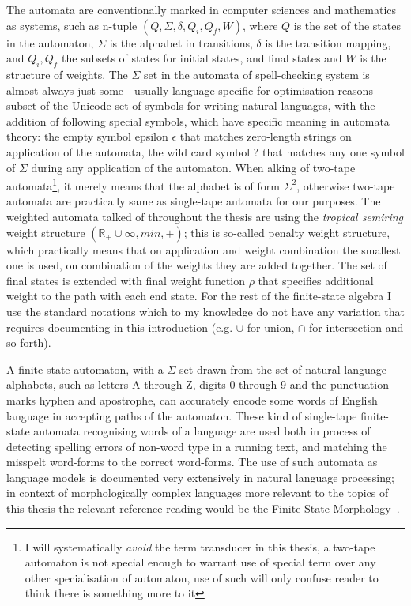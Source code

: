 \documentclass[officiallayout,draft]{unihelcompling}
\begin{document}
The automata are conventionally marked in computer sciences and mathematics as
systems, such as n-tuple $(Q, \Sigma, \delta, Q_i, Q_f, W)$, where $Q$ is the
set of the states in the automaton, $\Sigma$ is the alphabet in transitions,
$\delta$ is the transition mapping, and $Q_i, Q_f$ the subsets of states for
initial states, and final states and $W$ is the structure of weights. The
$\Sigma$ set in the automata of spell-checking system is almost always just
some---usually language specific for optimisation reasons---subset of the
Unicode set of symbols for writing natural languages, with the addition of
following special symbols, which have specific meaning in automata theory: the
empty symbol epsilon $\epsilon$ that matches zero-length strings on application
of the automata, the wild card symbol $?$ that matches any one symbol of
$\Sigma$ during any application of the automaton.  When alking of two-tape
automata\footnote{I will systematically \emph{avoid} the term transducer in
this thesis, a two-tape automaton is not special enough to warrant use of
special term over any other specialisation of automaton, use of such will only
confuse reader to think there is something more to it}, it merely means that
the alphabet is of form $\Sigma^2$, otherwise two-tape automata are practically
same as single-tape automata for our purposes. The weighted automata talked of
throughout the thesis are using the \emph{tropical semiring} weight structure
$(\mathbb{R}_+ \cup \infty, min, +)$; this is so-called penalty weight
structure, which practically means that on application and weight combination
the smallest one is used, on combination of the weights they are added
together. The set of final states is extended with final weight function $\rho$
that specifies additional weight to the path with each end state. For the rest
of the finite-state algebra I use the standard notations which to my knowledge
do not have any variation that requires documenting in this introduction (e.g.
$\cup$ for union, $\cap$ for intersection and so forth).

A finite-state automaton, with a $\Sigma$ set drawn from the set of natural
language alphabets, such as letters A through Z, digits 0 through 9 and the
punctuation marks hyphen and apostrophe, can accurately encode some words of
English language in accepting paths of the automaton. These kind of single-tape
finite-state automata recognising words of a language are used both in process
of detecting spelling errors of non-word type in a running text, and matching
the misspelt word-forms to the correct word-forms. The use of such automata as
language models is documented very extensively in natural language processing;
in context of morphologically complex languages more relevant to the topics of
this thesis the relevant reference reading would be the Finite-State Morphology~\citep{beesley2003finite,beesley2004morphological}.
\end{document}
